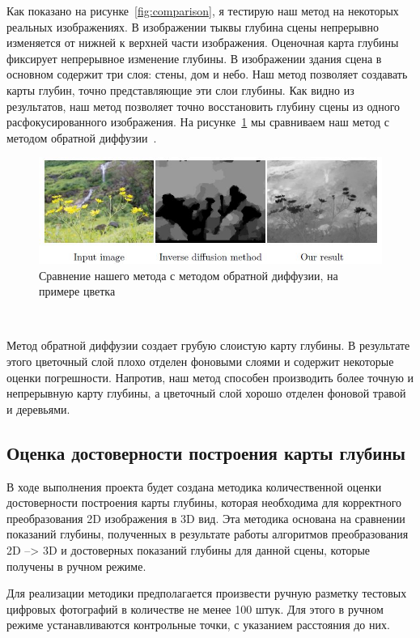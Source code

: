 Как показано на рисунке~\ref{fig:comparison}, я тестирую наш метод на некоторых реальных изображениях. В изображении тыквы глубина сцены непрерывно изменяется от нижней к верхней части изображения. Оценочная карта глубины фиксирует непрерывное изменение глубины. В изображении здания сцена в основном содержит три слоя: стены, дом и небо. Наш метод позволяет создавать карты глубин, точно представляющие эти слои глубины. Как видно из результатов, наш метод позволяет точно восстановить глубину сцены из одного расфокусированного изображения. На рисунке~\ref{fig:flower} мы сравниваем наш метод с методом обратной диффузии~\cite{Proc}.

\begin{figure}[H]
	\centering
	\includegraphics[width=1\linewidth]{pics/flower}
	\caption{Сравнение нашего метода с методом обратной диффузии, на примере цветка}
	\label{fig:flower}
\end{figure}\

Метод обратной диффузии создает грубую слоистую карту глубины. В результате этого цветочный слой плохо отделен фоновыми слоями и содержит некоторые оценки погрешности. Напротив, наш метод способен производить более точную и непрерывную карту глубины, а цветочный слой хорошо отделен фоновой травой и деревьями.

\subsection{Оценка достоверности построения карты глубины}

В ходе выполнения проекта будет создана методика количественной оценки достоверности построения карты глубины, которая необходима для корректного преобразования 2D изображения в 3D вид. Эта методика основана на сравнении показаний глубины, полученных в результате работы алгоритмов преобразования 2D –> 3D и достоверных показаний глубины для данной сцены, которые получены в ручном режиме.

Для реализации методики предполагается произвести ручную разметку тестовых цифровых фотографий в количестве не менее 100 штук. Для этого в ручном режиме устанавливаются контрольные точки, с указанием расстояния до них.

